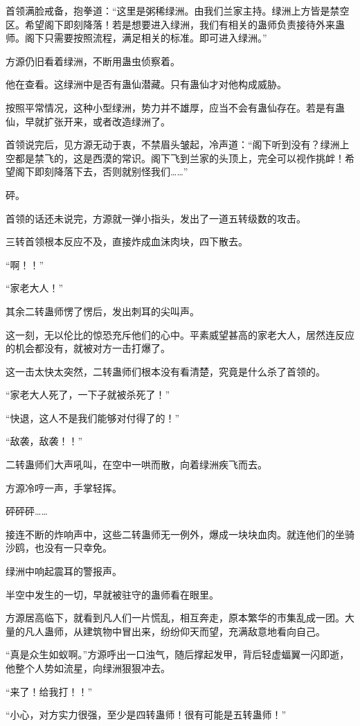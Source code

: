 \begin{this_body}
首领满脸戒备，抱拳道：“这里是粥稀绿洲。由我们兰家主持。绿洲上方皆是禁空区。希望阁下即刻降落！若是想要进入绿洲，我们有相关的蛊师负责接待外来蛊师。阁下只需要按照流程，满足相关的标准。即可进入绿洲。”

方源仍旧看着绿洲，不断用蛊虫侦察着。

他在查看。这绿洲中是否有蛊仙潜藏。只有蛊仙才对他构成威胁。

按照平常情况，这种小型绿洲，势力并不雄厚，应当不会有蛊仙存在。若是有蛊仙，早就扩张开来，或者改造绿洲了。

首领说完后，见方源无动于衷，不禁眉头皱起，冷声道：“阁下听到没有？绿洲上空都是禁飞的，这是西漠的常识。阁下飞到兰家的头顶上，完全可以视作挑衅！希望阁下即刻降落下去，否则就别怪我们……”

砰。

首领的话还未说完，方源就一弹小指头，发出了一道五转级数的攻击。

三转首领根本反应不及，直接炸成血沫肉块，四下散去。

“啊！！”

“家老大人！”

其余二转蛊师愣了愣后，发出刺耳的尖叫声。

这一刻，无以伦比的惊恐充斥他们的心中。平素威望甚高的家老大人，居然连反应的机会都没有，就被对方一击打爆了。

这一击太快太突然，二转蛊师们根本没有看清楚，究竟是什么杀了首领的。

“家老大人死了，一下子就被杀死了！”

“快退，这人不是我们能够对付得了的！”

“敌袭，敌袭！！”

二转蛊师们大声吼叫，在空中一哄而散，向着绿洲疾飞而去。

方源冷哼一声，手掌轻挥。

砰砰砰……

接连不断的炸响声中，这些二转蛊师无一例外，爆成一块块血肉。就连他们的坐骑沙鸥，也没有一只幸免。

绿洲中响起震耳的警报声。

半空中发生的一切，早就被驻守的蛊师看在眼里。

方源居高临下，就看到凡人们一片慌乱，相互奔走，原本繁华的市集乱成一团。大量的凡人蛊师，从建筑物中冒出来，纷纷仰天而望，充满敌意地看向自己。

“真是众生如蚁啊。”方源呼出一口浊气，随后撑起发甲，背后轻虚蝠翼一闪即逝，他整个人势如流星，向绿洲狠狠冲去。

“来了！给我打！！”

“小心，对方实力很强，至少是四转蛊师！很有可能是五转蛊师！”


\end{this_body}
